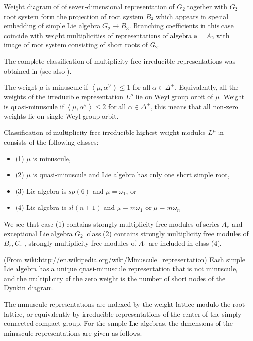 \documentclass{article}
\newcommand{\sfr}{\mathfrak{s}}
\begin{document}
Weight diagram of of seven-dimensional representation of $G_{2}$ together with $G_{2}$ root system
form the projection of root system $B_{3}$ which appears in special embedding of simple Lie algebra
$G_{2}\to B_{3}$. Branching coefficients in this case coincide with weight multiplicities of
representations of algebra $\sfr=A_{2}$ with image of root system consisting of short roots of
$G_{2}$. 

The complete classification of multiplicity-free irreducible representations was obtained in
\cite{howe1995perspectives} (see also \cite{stembridge2003multiplicity}).


The weight $\mu$ is minuscule if $\left<\mu,\alpha^{\vee}\right>\leq 1$ for all $\alpha\in
\Delta^{+}$. Equivalently, all the weights of the irreducible representation $L^{\mu}$ lie on Weyl
group orbit of $\mu$.  Weight is quasi-minuscule if  $\left<\mu,\alpha^{\vee}\right>\leq 2$ for all $\alpha\in
\Delta^{+}$, this means that all non-zero weights lie on single Weyl group orbit. 

Classification of multiplicity-free irreducible highest weight modules $L^{\mu}$ in
\cite{howe1995perspectives,stembridge2003multiplicity} consists of the following classes:
\begin{itemize}
\item (1) $\mu$ is minuscule,
\item (2) $\mu$ is quasi-minuscule and Lie algebra has only one short simple root,
\item (3) Lie algebra is $sp(6)$ and $\mu=\omega_{1}$, or
\item (4) Lie algebra is $sl(n + 1)$ and  $\mu= m\omega_{1}$ or $\mu  = m\omega_{n}$ 
\end{itemize}

We see that case (1) contains strongly multiplicity free modules of series $A_{r}$ and exceptional
Lie algebra $G_{2}$, class (2) contains strongly multiplicity free modules of $ B_{r}, C_{r}$ ,
strongly multiplicity free modules of $A_{1}$ are included in class (4).

(From wiki:http://en.wikipedia.org/wiki/Minuscule_representation)
Each simple Lie algebra has a unique quasi-minuscule representation that is not minuscule, and the
multiplicity of the zero weight is the number of short nodes of the Dynkin diagram.

The minuscule representations are indexed by the weight lattice modulo the root lattice, or
equivalently by irreducible representations of the center of the simply connected compact group. For
the simple Lie algebras, the dimensions of the minuscule representations are given as follows.
\end{document}
